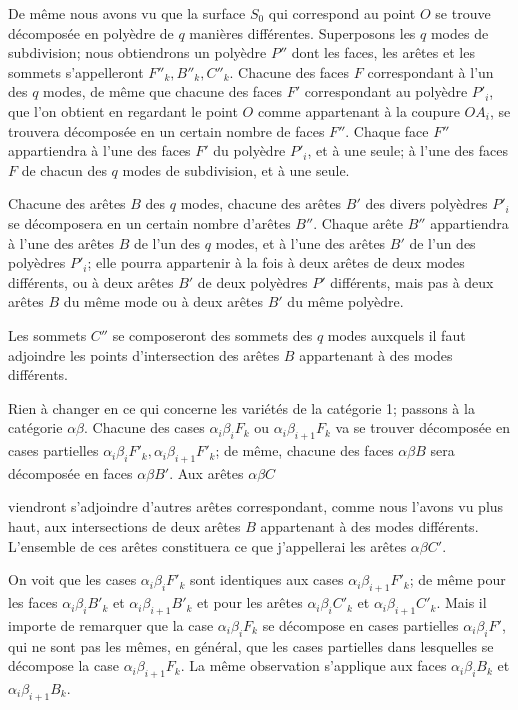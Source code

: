 \documentclass{article}
\begin{document}
De même nous avons vu que la surface $S_{0}$ qui correspond au point $O$ se trouve décomposée en polyèdre de $q$ manières différentes. Superposons les $q$ modes de subdivision; nous obtiendrons un polyèdre $P''$ dont les faces, les arêtes et les sommets s'appelleront $F''_{k}, B''_{k}, C''_{k}$. Chacune des faces $F$ correspondant à l'un des $q$ modes, de même que chacune des faces $F'$ correspondant au polyèdre $P'_{i}$, que l'on obtient en regardant le point $O$ comme appartenant à la coupure $OA_{i}$, se trouvera décomposée en un certain nombre de faces $F''$. Chaque face $F''$ appartiendra à l'une des faces $F'$ du polyèdre $P'_{i}$, et à une seule; à l'une des faces $F$ de chacun des $q$ modes de subdivision, et à une seule.

Chacune des arêtes $B$ des $q$ modes, chacune des arêtes $B'$ des divers polyèdres $P'_{i}$ se décomposera en un certain nombre d'arêtes $B''$. Chaque arête $B''$ appartiendra à l'une des arêtes $B$ de l'un des $q$ modes, et à l'une des arêtes $B'$ de l'un des polyèdres $P'_{i}$; elle pourra appartenir à la fois à deux arêtes de deux modes différents, ou à deux arêtes $B'$ de deux polyèdres $P'$ différents, mais pas à deux arêtes $B$ du même mode ou à deux arêtes $B'$ du même polyèdre.

Les sommets $C''$ se composeront des sommets des $q$ modes auxquels il faut adjoindre les points d'intersection des arêtes $B$ appartenant à des modes différents.

Rien à changer en ce qui concerne les variétés de la catégorie 1; passons à la catégorie $\alpha\beta$. Chacune des cases $\alpha_{i}\beta_{i}F_{k}$ ou $\alpha_{i}\beta_{i+1}F_{k}$ va se trouver décomposée en cases partielles $\alpha_{i}\beta_{i}F'_{k}, \alpha_{i}\beta_{i+1}F'_{k}$; de même, chacune des faces $\alpha\beta B$ sera décomposée en faces $\alpha\beta B'$. Aux arêtes $\alpha\beta C$

viendront s'adjoindre d'autres arêtes correspondant, comme nous l'avons vu plus haut, aux intersections de deux arêtes $B$ appartenant à des modes différents. L'ensemble de ces arêtes constituera ce que j'appellerai les arêtes $\alpha\beta C'$.

On voit que les cases $\alpha_{i}\beta_{i}F'_{k}$ sont identiques aux cases $\alpha_{i}\beta_{i+1}F'_{k}$; de même pour les faces $\alpha_{i}\beta_{i}B'_{k}$ et $\alpha_{i}\beta_{i+1}B'_{k}$ et pour les arêtes $\alpha_{i}\beta_{i}C'_{k}$ et $\alpha_{i}\beta_{i+1}C'_{k}$. Mais il importe de remarquer que la case $\alpha_{i}\beta_{i}F_{k}$ se décompose en cases partielles $\alpha_{i}\beta_{i}F'$, qui ne sont pas les mêmes, en général, que les cases partielles dans lesquelles se décompose la case $\alpha_{i}\beta_{i+1}F_{k}$. La même observation s'applique aux faces $\alpha_{i}\beta_{i}B_{k}$ et $\alpha_{i}\beta_{i+1}B_{k}$.
\end{document}
